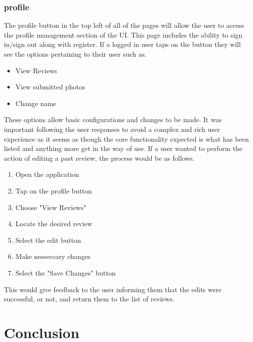 \documentclass{article}
\begin{document}
\subsubsection{profile}
The profile button in the top left of all of the pages will allow the user to access the profile management section of the UI.
This page includes the ability to sign in/sign out along with register.
If a logged in user taps on the button they will see the options pertaining to their user such as.
\begin{itemize}
	\item View Reviews
	\item View submitted photos
	\item Change name
\end{itemize}
These options allow basic configurations and changes to be made.
It was important following the user responses to avoid a complex and rich user experience as it seems as though the core functionality expected is what has been listed and anything more get in the way of use.
If a user wanted to perform the action of editing a past review, the process would be as follows.
\begin{enumerate}
	\item Open the application
	\item Tap on the profile button
	\item Choose "View Reviews"
	\item Locate the desired review
	\item Select the edit button
	\item Make nesseccary changes
	\item Select the "Save Changes" button
\end{enumerate}

This would give feedback to the user informing them that the edits were successful, or not, and return them to the list of reviews.

\section{Conclusion}
\end{document}
